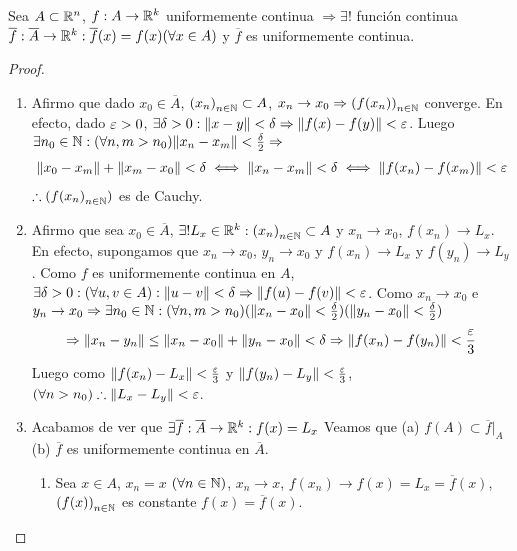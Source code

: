 \clearpage

\begin{theorem}
  Sea \(A \subset \mathbb{R}^n\), \(f: A \to \mathbb{R}^k\) uniformemente continua \(\Rightarrow \exists \)! función continua \(\overline{f}: \overline{A} \to \mathbb{R}^k : \overline{f}(x) = f(x) (\forall x \in A)\) y \(\overline{f} \) es uniformemente continua.
  \begin{proof}
    \begin{enumerate}
      \item Afirmo que dado \(x_0 \in \overline{A} \), \({(x_n)}_{n \in \mathbb{N}} \subset A\), \(x_n \to x_0 \Rightarrow {(f(x_n))}_{n \in \mathbb{N}} \) converge. En efecto, dado \(\varepsilon > 0\), \(\exists \delta > 0 : \|x-y\| < \delta \Rightarrow \|f(x) - f(y)\| < \varepsilon \). Luego \(\exists n_0 \in \mathbb{N} : (\forall n, m > n_0) \|x_n - x_m\| < \frac{\delta}{2} \Rightarrow \) \begin{align*}
              \|x_0 - x_m\| + \|x_m - x_0\| < \delta \iff \|x_n - x_m\| < \delta \iff \|f(x_n) - f(x_m)\| < \varepsilon
            \end{align*} \( \therefore (f{(x_n)}_{n \in \mathbb{N}}) \) es de Cauchy.
      \item Afirmo que sea \(x_0 \in \overline{A} \), \(\exists ! L_x \in \mathbb{R}^k : {(x_n)}_{n \in \mathbb{N}} \subset A\) y \(x_n \to x_0\), \(f(x_n) \to L_x\). En efecto, supongamos que \(x_n \to x_0\), \(y_n \to x_0\) y \(f(x_n) \to L_x\) y \(f(y_n) \to L_y\). Como \(f\) es uniformemente continua en \(A\), \(\exists \delta > 0 : (\forall u, v \in A) : \|u-v\| < \delta \Rightarrow \|f(u) - f(v)\| < \varepsilon \). Como \(x_n \to x_0\) e \(y_n \to x_0 \Rightarrow \exists n_0 \in \mathbb{N} : (\forall n, m > n_0) (\|x_n - x_0\| < \frac{\delta}{2}) (\| y_n - x_0 \| < \frac{\delta}{2})\) \begin{align*}
              \Rightarrow \|x_n - y_n\| \leq \|x_n - x_0\| + \|y_n - x_0\| < \delta \Rightarrow \|f(x_n) - f(y_n)\| < \frac{\varepsilon}{3}
            \end{align*} Luego como \( \|f(x_n) - L_x\| < \frac{\varepsilon}{3} \) y \( \|f(y_n) - L_y\| < \frac{\varepsilon}{3} \), \((\forall n > n_0) \therefore \|L_x - L_y\| < \varepsilon \).
      \item Acabamos de ver que \(\exists \overline{f}: \overline{A} \to \mathbb{R}^k : f(x) = L_x\) Veamos que (a) \(f(A) \subset \overline{f}|_A\) (b) \(\overline{f} \) es uniformemente continua en \(\overline{A} \).\begin{enumerate}
              \item Sea \(x \in A\), \(x_n = x\) \((\forall n \in \mathbb{N})\), \(x_n \to x\), \(f(x_n) \to f(x) = L_x = \overline{f}(x)\), \({(f(x))}_{n \in \mathbb{N}} \) es constante \(f(x) = \overline{f}(x)\).

\end{enumerate}
\end{enumerate}
\end{proof}
\end{theorem}
